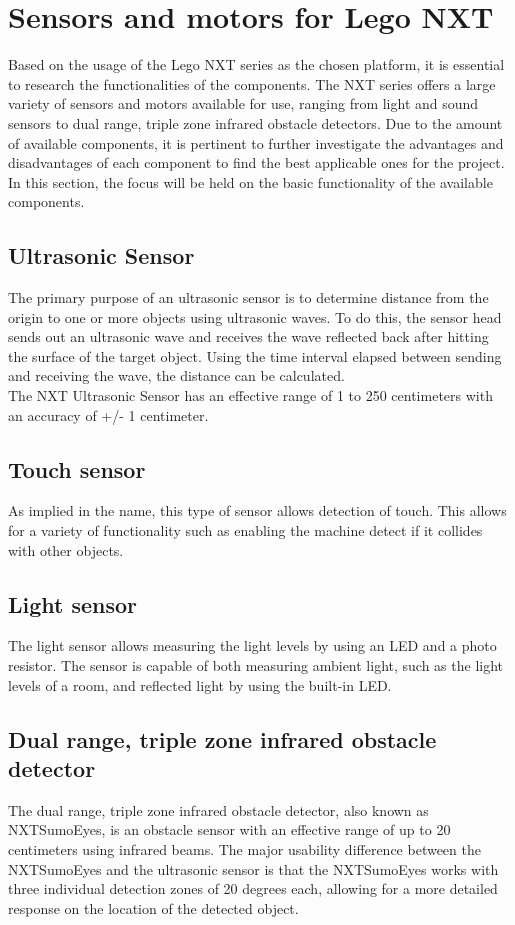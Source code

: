 \section{Sensors and motors for Lego NXT}
Based on the usage of the Lego NXT series as the chosen platform, it is essential to research the functionalities of the components. 
The NXT series offers a large variety of sensors and motors available for use, ranging from light and sound sensors to dual range, triple zone infrared obstacle detectors.
Due to the amount of available components, it is pertinent to further investigate the advantages and disadvantages of each component to find the best applicable ones for the project.\\
In this section, the focus will be held on the basic functionality of the available components.

\subsection{Ultrasonic Sensor}
The primary purpose of an ultrasonic sensor is to determine distance from the origin to one or more objects using ultrasonic waves.
To do this, the sensor head sends out an ultrasonic wave and receives the wave reflected back after hitting the surface of the target object.
Using the time interval elapsed between sending and receiving the wave, the distance can be calculated.\\
The NXT Ultrasonic Sensor has an effective range of 1 to 250 centimeters with an accuracy of +/- 1 centimeter.

\subsection*{Touch sensor}
As implied in the name, this type of sensor allows detection of touch.
This allows for a variety of functionality such as enabling the machine detect if it collides with other objects.

\subsection*{Light sensor}
The light sensor allows measuring the light levels by using an LED and a photo resistor.
The sensor is capable of both measuring ambient light, such as the light levels of a room, and reflected light by using the built-in LED.

\subsection*{Dual range, triple zone infrared obstacle detector}
The dual range, triple zone infrared obstacle detector, also known as NXTSumoEyes, is an obstacle sensor with an effective range of up to 20 centimeters using infrared beams.
The major usability difference between the NXTSumoEyes and the ultrasonic sensor is that the NXTSumoEyes works with three individual detection zones of 20 degrees each, allowing for a more detailed response on the location of the detected object.


